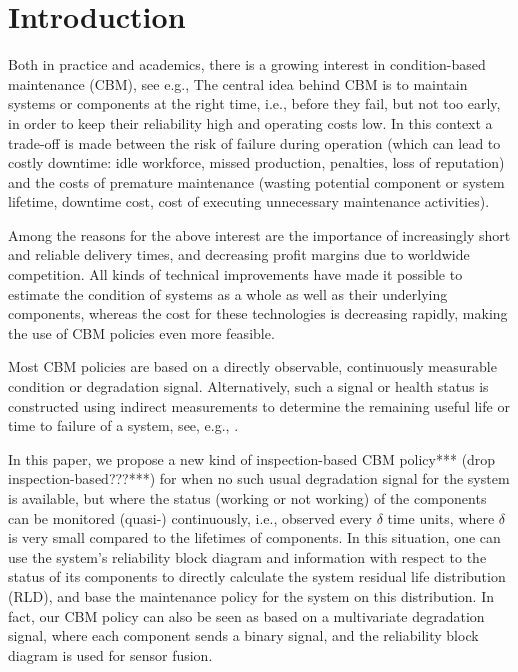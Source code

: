\documentclass[authoryear]{elsarticle}
\begin{document}

\section{Introduction}
\label{intro}

Both in practice and academics,
there is a growing interest in condition-based maintenance (CBM), see e.g.,
\citet{2017:oldekeizer}
The central idea behind CBM is to maintain systems or components at the right time,
i.e., before they fail, but not too early, in order to keep their reliability high and operating costs low.
In this context a trade-off is made between the risk of failure during operation
(which can lead to costly downtime: idle workforce, missed production, penalties, loss of reputation)
and the costs of premature maintenance (wasting potential component or system lifetime,
downtime cost, cost of executing unnecessary maintenance activities).

Among the reasons for the above interest are the importance of increasingly short and
reliable delivery times, and decreasing profit margins due to worldwide competition.
All kinds of technical improvements have made it possible %
to estimate the condition of systems as a whole as well as their underlying components,
whereas the cost for these technologies is decreasing rapidly,
making the use of CBM policies even more feasible.

Most CBM policies are based on a directly observable, continuously measurable condition or degradation signal.
Alternatively, such a signal or health status is constructed
using indirect measurements to determine the remaining useful life or time to failure of a system,
see, e.g., \citet{2014:rul-review, 2011:rul-review-statistical}.

In this paper, we propose a new kind of inspection-based CBM policy*** (drop inspection-based???***)
for when no such usual degradation signal for the system is available,
but where the status (working or not working) of the components can be monitored (quasi-) continuously,
i.e., observed every $\delta$ time units, where $\delta$ is very small compared to the lifetimes of components. 
In this situation, one can use the system's reliability block diagram
and information with respect to the status of its components
to directly calculate the system residual life distribution (RLD),
and base the maintenance policy for the system on this distribution.
In fact, our CBM policy can also be seen as based on a multivariate degradation signal,
where each component sends a binary signal, and the reliability block diagram is used for sensor fusion.
\end{document}
